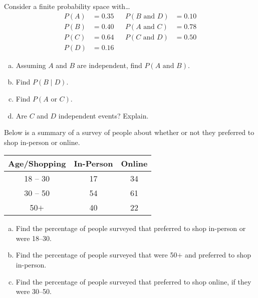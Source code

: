 \documentclass[12pt,letterpaper]{exam}
\begin{document}
\examtitle
{} 
\scores
\bottomline
\newpage

\begin{questions}

\newpage
\question[10] Consider a finite probability space with\dots
	\[
	\begin{aligned}
	P(A)&= 0.35 & & P(B \text{ and } D)&= 0.10 \\
	P(B)&= 0.40 & & P(A \text{ and } C)&= 0.78 \\
	P(C)&= 0.64 & & P(C \text{ and } D)&= 0.50 \\
	P(D)&= 0.16
	\end{aligned}
	\]

\begin{enumerate}[(a)]
\item Assuming $A$ and $B$ are independent, find $P(A \text{ and } B)$. 
\item Find $P(B \;|\; D)$.
\item Find $P(A \text{ or } C)$.
\item Are $C$ and $D$ independent events? Explain. 
\end{enumerate}



\newpage
\question[10] Below is a summary of a survey of people about whether or not they preferred to shop in-person or online. \par
	\begin{table}[h]
	\centering
	\begin{tabular}{c|cc}
	Age/Shopping & In-Person & Online \\ \hline
	18 -- 30 & 17 & 34 \\
	30 -- 50 & 54 & 61 \\
	50$+$ & 40 & 22
	\end{tabular}
	\end{table} \par

\begin{enumerate}[(a)]
\item Find the percentage of people surveyed that preferred to shop in-person or were 18--30. 
\item Find the percentage of people surveyed that were 50$+$ and preferred to shop in-person. 
\item Find the percentage of people surveyed that preferred to shop online, if they were 30--50. 
\end{enumerate}




\end{questions}
\end{document}
